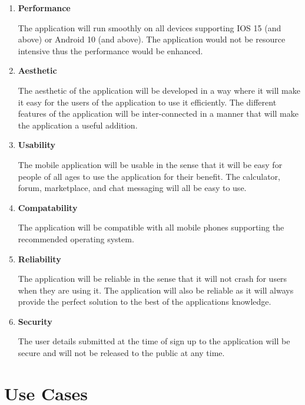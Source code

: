 \documentclass{article}
\begin{document}
\begin{enumerate}

    \item \textbf{Performance}

          The application will run smoothly on all devices supporting IOS 15 (and above)
          or Android 10 (and above). The application would not be resource intensive thus
          the performance would be enhanced.

    \item \textbf{Aesthetic}

          The aesthetic of the application will be developed in a way where it will make
          it easy for the users of the application to use it efficiently. The different
          features of the application will be inter-connected in a manner that will make
          the application a useful addition.

    \item \textbf{Usability}

          The mobile application will be usable in the sense that it will be easy for
          people of all ages to use the application for their benefit. The calculator,
          forum, marketplace, and chat messaging will all be easy to use.

    \item \textbf{Compatability}

          The application will be compatible with all mobile phones supporting the
          recommended operating system.

    \item \textbf{Reliability}

          The application will be reliable in the sense that it will not crash for users
          when they are using it. The application will also be reliable as it will always
          provide the perfect solution to the best of the applications knowledge.

    \item \textbf{Security}

          The user details submitted at the time of sign up to the application will be
          secure and will not be released to the public at any time.

\end{enumerate}

\section*{Use Cases}
\end{document}
